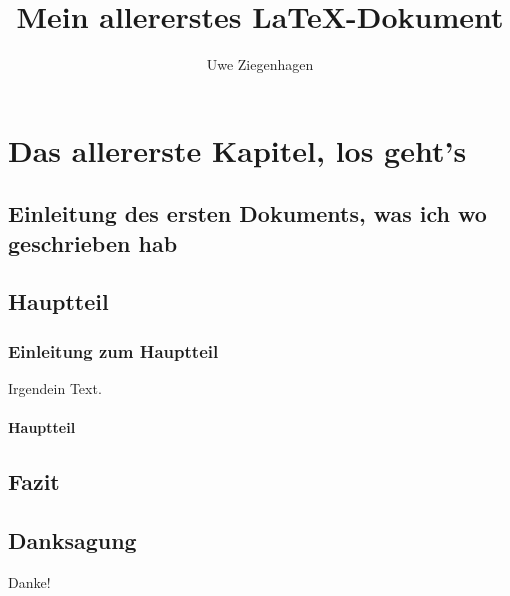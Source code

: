 \documentclass[12pt,ngerman]{scrreprt}
\author{Uwe Ziegenhagen}
\title{Mein allererstes \LaTeX-Dokument}
\begin{document}
\maketitle

\tableofcontents

\chapter{Das allererste Kapitel, los geht's}

\section{Einleitung des ersten Dokuments, was ich wo geschrieben hab}

\blindtext

\section{Hauptteil}

\subsection{Einleitung zum Hauptteil}

Irgendein Text.

\subsubsection{Hauptteil}


\blindtext[2]

\blindtext[2]


\section{Fazit}

\blindtext[100]


\section{Danksagung}

Danke!
\end{document}
